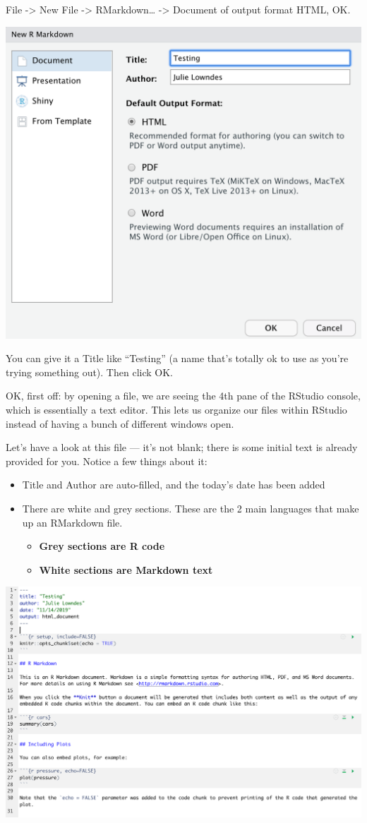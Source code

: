 \documentclass[]{book}
\providecommand{\tightlist}{%
  \setlength{\itemsep}{0pt}\setlength{\parskip}{0pt}}
\begin{document}
File -\textgreater{} New File -\textgreater{} RMarkdown\ldots{} -\textgreater{} Document of output format HTML, OK.

\includegraphics[width=0.8\linewidth]{img/rstudio_new-rmd-doc-html}

You can give it a Title like ``Testing'' (a name that's totally ok to use as you're trying something out). Then click OK.

OK, first off: by opening a file, we are seeing the 4th pane of the RStudio console, which is essentially a text editor. This lets us organize our files within RStudio instead of having a bunch of different windows open.

Let's have a look at this file --- it's not blank; there is some initial text is already provided for you. Notice a few things about it:

\begin{itemize}
\tightlist
\item
  Title and Author are auto-filled, and the today's date has been added
\item
  There are white and grey sections. These are the 2 main languages that make up an RMarkdown file.

  \begin{itemize}
  \tightlist
  \item
    \textbf{Grey sections are R code}
  \item
    \textbf{White sections are Markdown text}
  \end{itemize}
\end{itemize}

\includegraphics[width=0.8\linewidth]{img/rmarkdown}
\end{document}
